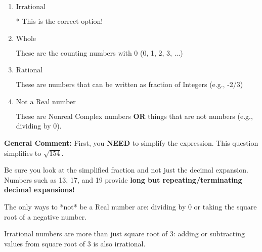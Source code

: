 \documentclass{extbook}[14pt]
\begin{document}
\begin{enumerate}
{\begin{enumerate}[label=\Alph*.]
These are the negative and positive counting numbers (..., -3, -2, -1, 0, 1, 2, 3, ...)
\item \( \text{Irrational} \)

* This is the correct option!
\item \( \text{Whole} \)

These are the counting numbers with 0 (0, 1, 2, 3, ...)
\item \( \text{Rational} \)

These are numbers that can be written as fraction of Integers (e.g., -2/3)
\item \( \text{Not a Real number} \)

These are Nonreal Complex numbers \textbf{OR} things that are not numbers (e.g., dividing by 0).
\end{enumerate}

\textbf{General Comment:} First, you \textbf{NEED} to simplify the expression. This question simplifies to $\sqrt{154}$. 
 
 Be sure you look at the simplified fraction and not just the decimal expansion. Numbers such as 13, 17, and 19 provide \textbf{long but repeating/terminating decimal expansions!} 
 
 The only ways to *not* be a Real number are: dividing by 0 or taking the square root of a negative number. 
 
 Irrational numbers are more than just square root of 3: adding or subtracting values from square root of 3 is also irrational.
}
\end{enumerate}
\end{document}
